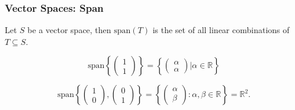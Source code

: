 \documentclass{beamer}
\begin{document}
\begin{frame}\frametitle{Vector Spaces: Span}

\begin{definition}[Span]
	Let $S$ be a vector space, then $\text{span}(T)$ is the set of all linear combinations of $T\subseteq S$.
\end{definition}
 
\begin{example} 
\[
\text{span}\left\{ \left( \begin{array}{c} 1 \\ 1 \end{array} \right) \right\} = \left\{ \begin{pmatrix} \alpha \\ \alpha \end{pmatrix} | \alpha\in\mathbb{R} \right\}
\]
\end{example}
\begin{example} 
\[
\text{span}\left\{ \left( \begin{array}{c} 1\\0 \end{array}\right),\left(\begin{array}{c}0\\1\end{array}\right)\right\}= \left\{\begin{pmatrix} \alpha \\ \beta \end{pmatrix}:\alpha, \beta\in\mathbb{R}\right\} = \mathbb{R}^2.
\]
\end{example}
\end{frame}
\end{document}
